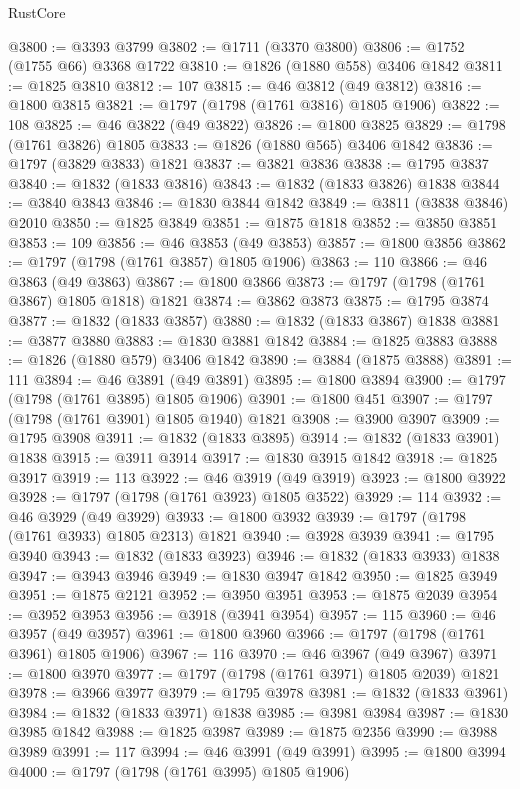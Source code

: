 \begin{lexlean}{RustCore}
\begin{coremodule}
@3800 := @3393 @3799
@3802 := @1711 (@3370 @3800)
@3806 := @1752 (@1755 @66) @3368 @1722
@3810 := @1826 (@1880 @558) @3406 @1842
@3811 := @1825 @3810
@3812 := 107
@3815 := @46 @3812 (@49 @3812)
@3816 := @1800 @3815
@3821 := @1797 (@1798 (@1761 @3816) @1805 @1906)
@3822 := 108
@3825 := @46 @3822 (@49 @3822)
@3826 := @1800 @3825
@3829 := @1798 (@1761 @3826) @1805
@3833 := @1826 (@1880 @565) @3406 @1842
@3836 := @1797 (@3829 @3833) @1821
@3837 := @3821 @3836
@3838 := @1795 @3837
@3840 := @1832 (@1833 @3816)
@3843 := @1832 (@1833 @3826) @1838
@3844 := @3840 @3843
@3846 := @1830 @3844 @1842
@3849 := @3811 (@3838 @3846) @2010
@3850 := @1825 @3849
@3851 := @1875 @1818
@3852 := @3850 @3851
@3853 := 109
@3856 := @46 @3853 (@49 @3853)
@3857 := @1800 @3856
@3862 := @1797 (@1798 (@1761 @3857) @1805 @1906)
@3863 := 110
@3866 := @46 @3863 (@49 @3863)
@3867 := @1800 @3866
@3873 := @1797 (@1798 (@1761 @3867) @1805 @1818) @1821
@3874 := @3862 @3873
@3875 := @1795 @3874
@3877 := @1832 (@1833 @3857)
@3880 := @1832 (@1833 @3867) @1838
@3881 := @3877 @3880
@3883 := @1830 @3881 @1842
@3884 := @1825 @3883
@3888 := @1826 (@1880 @579) @3406 @1842
@3890 := @3884 (@1875 @3888)
@3891 := 111
@3894 := @46 @3891 (@49 @3891)
@3895 := @1800 @3894
@3900 := @1797 (@1798 (@1761 @3895) @1805 @1906)
@3901 := @1800 @451
@3907 := @1797 (@1798 (@1761 @3901) @1805 @1940) @1821
@3908 := @3900 @3907
@3909 := @1795 @3908
@3911 := @1832 (@1833 @3895)
@3914 := @1832 (@1833 @3901) @1838
@3915 := @3911 @3914
@3917 := @1830 @3915 @1842
@3918 := @1825 @3917
@3919 := 113
@3922 := @46 @3919 (@49 @3919)
@3923 := @1800 @3922
@3928 := @1797 (@1798 (@1761 @3923) @1805 @3522)
@3929 := 114
@3932 := @46 @3929 (@49 @3929)
@3933 := @1800 @3932
@3939 := @1797 (@1798 (@1761 @3933) @1805 @2313) @1821
@3940 := @3928 @3939
@3941 := @1795 @3940
@3943 := @1832 (@1833 @3923)
@3946 := @1832 (@1833 @3933) @1838
@3947 := @3943 @3946
@3949 := @1830 @3947 @1842
@3950 := @1825 @3949
@3951 := @1875 @2121
@3952 := @3950 @3951
@3953 := @1875 @2039
@3954 := @3952 @3953
@3956 := @3918 (@3941 @3954)
@3957 := 115
@3960 := @46 @3957 (@49 @3957)
@3961 := @1800 @3960
@3966 := @1797 (@1798 (@1761 @3961) @1805 @1906)
@3967 := 116
@3970 := @46 @3967 (@49 @3967)
@3971 := @1800 @3970
@3977 := @1797 (@1798 (@1761 @3971) @1805 @2039) @1821
@3978 := @3966 @3977
@3979 := @1795 @3978
@3981 := @1832 (@1833 @3961)
@3984 := @1832 (@1833 @3971) @1838
@3985 := @3981 @3984
@3987 := @1830 @3985 @1842
@3988 := @1825 @3987
@3989 := @1875 @2356
@3990 := @3988 @3989
@3991 := 117
@3994 := @46 @3991 (@49 @3991)
@3995 := @1800 @3994
@4000 := @1797 (@1798 (@1761 @3995) @1805 @1906)

\end{coremodule}
\end{lexlean}
